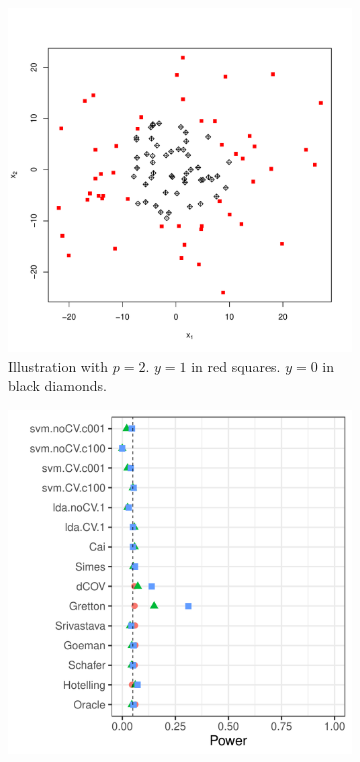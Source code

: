 \documentclass[]{bio}
\begin{document}
\begin{figure}[th]
	\centering
	\begin{subfigure}[t]{.3\columnwidth}
		\centering
		\includegraphics[width=1\linewidth]{art/quadratic-form}
		\caption{
			Illustration with $p=2$. 
			$y=1$ in red squares. 
			$y=0$ in black diamonds.}
		\label{fig:quadratic-form}
	\end{subfigure}
	\begin{subfigure}[t]{.3\columnwidth}
		\centering
	\includegraphics[width=1\columnwidth]{"art/file42"}

\end{subfigure}
\end{figure}
\end{document}
